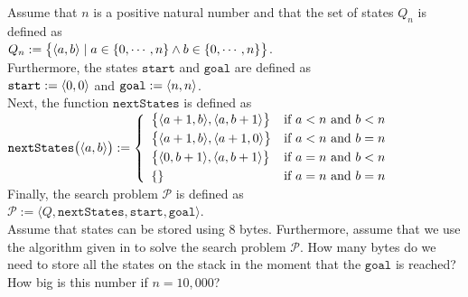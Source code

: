\exercise
Assume that $n$ is a positive natural number and that the set of states $Q_n$ is defined as
\\[0.2cm]
\hspace*{1.3cm}
$Q_n := \bigl\{ \pair(a, b) \mid a \in \{0,\cdots,n\} \wedge b \in \{0,\cdots,n\} \bigr\}$.
\\[0.2cm]
Furthermore, the states $\mathtt{start}$ and $\mathtt{goal}$ are defined as
\\[0.2cm]
\hspace*{1.3cm}
$\mathtt{start} := \pair(0,0)$ \quad and \quad $\mathtt{goal} := \pair(n,n)$.
\\[0.2cm]
Next, the function $\mathtt{nextStates}$ is defined as
\\[0.2cm]
\hspace*{1.3cm}
$\mathtt{nextStates}\bigl(\pair(a,b)\bigr) := \left\{
\begin{array}{ll}
\bigl\{\pair(a+1,b), \pair(a,b+1)\bigr\}  & \mbox{if $a < n$ and $b < n$} \\[0.1cm]
\bigl\{\pair(a+1,b), \pair(a+1,0)\bigr\}  & \mbox{if $a < n$ and $b = n$} \\[0.1cm]
\bigl\{\pair(0,b+1), \pair(a,b+1)\bigr\}  & \mbox{if $a = n$ and $b < n$} \\[0.1cm]
\{\}  & \mbox{if $a = n$ and $b = n$}
\end{array}
\right.
$
\\[0.2cm]
Finally, the search problem $\mathcal{P}$ is defined as
\\[0.2cm]
\hspace*{1.3cm}
$\mathcal{P} := \langle Q, \mathtt{nextStates}, \mathtt{start}, \mathtt{goal} \rangle$.
\\[0.2cm]
Assume that states can be stored using 8 bytes.  Furthermore, assume that we use the algorithm given in
 to solve the search problem $\mathcal{P}$.
How many bytes do we need to store all the states on the stack in the moment that the $\mathtt{goal}$
is reached? How big is this number if $n = 10,000$?
\vspace*{0.2cm}

